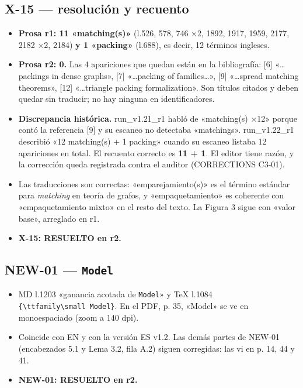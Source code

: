 \documentclass[
]{article}
\providecommand{\tightlist}{%
  \setlength{\itemsep}{0pt}\setlength{\parskip}{0pt}}
\begin{document}
\subsection{X-15 --- resolución y
recuento}\label{x-15--resoluciuxf3n-y-recuento}

\begin{itemize}
\tightlist
\item
  \textbf{Prosa r1: 11 «matching(s)»} (l.526, 578, 746 ×2, 1892, 1917,
  1959, 2177, 2182 ×2, 2184) \textbf{y 1 «packing»} (l.688), es decir,
  12 términos ingleses.
\item
  \textbf{Prosa r2: 0.} Las 4 apariciones que quedan están en la
  bibliografía: {[}6{]} «\ldots packings in dense graphs», {[}7{]}
  «\ldots packing of families\ldots», {[}9{]} «\ldots spread matching
  theorems», {[}12{]} «\ldots triangle packing formalization». Son
  títulos citados y deben quedar sin traducir; no hay ninguna en
  identificadores.
\item
  \textbf{Discrepancia histórica.} run\_v1.21\_r1 habló de «matching(s)
  ×12» porque contó la referencia {[}9{]} y su escaneo no detectaba
  «matchings». run\_v1.22\_r1 describió «12 matching(s) + 1 packing»
  cuando su escaneo listaba 12 apariciones en total. El recuento
  correcto es \textbf{11 + 1}. El editor tiene razón, y la corrección
  queda registrada contra el auditor (CORRECTIONS C3-01).
\item
  Las traducciones son correctas: «emparejamiento(s)» es el término
  estándar para \emph{matching} en teoría de grafos, y «empaquetamiento»
  es coherente con «empaquetamiento mixto» en el resto del texto. La
  Figura 3 sigue con «valor base», arreglado en r1.
\item
  \textbf{X-15: RESUELTO en r2.}
\end{itemize}

\subsection{\texorpdfstring{NEW-01 ---
\texttt{Model}}{NEW-01 --- Model}}\label{new-01--model}

\begin{itemize}
\tightlist
\item
  MD l.1203 «ganancia acotada de \texttt{Model}» y TeX l.1084
  \texttt{\{\textbackslash{}ttfamily\textbackslash{}small\ Model\}}. En
  el PDF, p. 35, «Model» se ve en monoespaciado (zoom a 140 dpi).
\item
  Coincide con EN y con la versión ES v1.2. Las demás partes de NEW-01
  (encabezados 5.1 y Lema 3.2, fila A.2) siguen corregidas: las vi en p.
  14, 44 y 41.
\item
  \textbf{NEW-01: RESUELTO en r2.}
\end{itemize}
\end{document}
